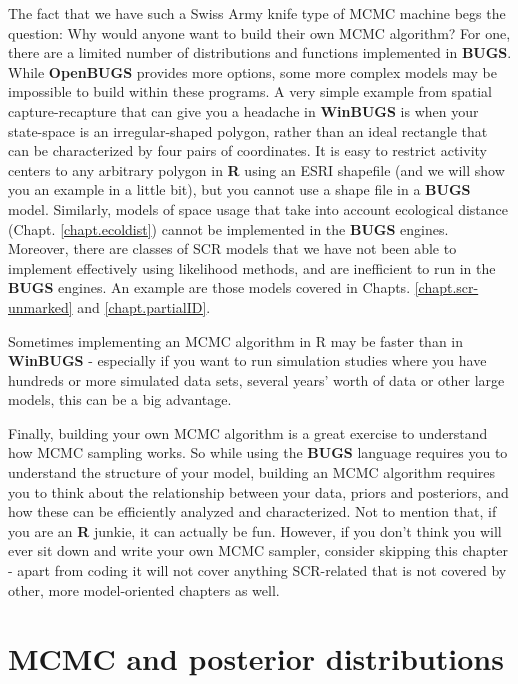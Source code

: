 The fact that we have such a Swiss Army knife type of MCMC machine
begs the question: Why would anyone want to build their own MCMC
algorithm? For one, there are a limited number of distributions and
functions implemented in {\bf BUGS}. While {\bf OpenBUGS} provides more
options, some more complex models may be impossible to build within
these programs. A very simple example from spatial capture-recapture
that can give you a headache in {\bf WinBUGS} is when your state-space is an
irregular-shaped polygon, rather than an ideal rectangle that can be
characterized by four pairs of coordinates. It is easy to restrict
activity centers to any arbitrary polygon in {\bf R} using an ESRI shapefile
(and we will show you an example in a little bit), but you cannot use
a shape file in a {\bf BUGS} model.  Similarly, models of space usage
that take into account ecological distance
(Chapt. \ref{chapt.ecoldist}) cannot be implemented in the {\bf BUGS}
engines.  Moreover, there are classes of 
SCR models that we have not been able to implement effectively using
likelihood methods, and are inefficient to run in the {\bf BUGS}
engines. An example are those models covered in Chapts. 
\ref{chapt.scr-unmarked} and \ref{chapt.partialID}. 

Sometimes implementing an MCMC algorithm in R may be faster than in
{\bf WinBUGS} - especially if you want to run simulation studies where you
have hundreds or more simulated data sets, several years' worth of
data or other large models, this can be a big advantage.

Finally, building your own MCMC algorithm is a great exercise to
understand how MCMC sampling works. So while using the {\bf BUGS}
language requires you to understand the structure of your model,
building an MCMC algorithm requires you to think about the
relationship between your data, priors and posteriors, and how these
can be efficiently analyzed and characterized. Not to mention that, if
you are an {\bf R} junkie, it can actually be fun.  However, if you
don't think you will ever sit down and write your own MCMC sampler,
consider skipping this chapter - apart from coding it will not cover
anything SCR-related that is not covered by other, more model-oriented
chapters as well.


\section{MCMC and posterior distributions}

